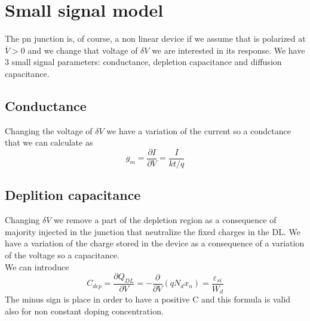 \section{Small signal model}
The pn junction is, of course, a non linear device if we assume that is polarized at $\overline{V}>0$ and we change that voltage of $\delta V$ we are interested in its response. We have 3 small signal parameters: conductance, depletion capacitance and diffusion capacitance.
\subsection{Conductance}
Changing the voltage of $\delta V$ we have a variation of the current so a condctance that we can calculate as 
\begin{equation}
g_m=\frac{\partial I}{\partial V}=\frac{I}{kt/q}
\end{equation}
\subsection{Deplition capacitance}
Changing $\delta V$ we remove a part of the depletion region as a consequence of majority injected in the junction that neutralize the fixed charges in the DL. We have a variation of the charge stored in the device as a consequence of a variation of the voltage so a capacitance.\\
We can introduce 
\begin{equation}
C_{dep}=\frac{\partial Q_{DL}}{\partial V}=-\frac{\partial }{\partial V}(qN_dx_n)=\frac{\varepsilon_{si}}{W_d}
\end{equation}
The minus sign is place in order to have a positive C and this formula is valid also for non constant doping concentration.\\
